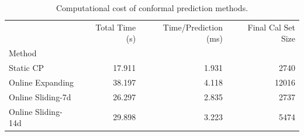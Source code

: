 \begin{table}
\caption{Computational cost of conformal prediction methods.}
\label{tab:t54_computational_cost}
\begin{tabular}{lrrr}
\toprule
 & Total Time (s) & Time/Prediction (ms) & Final Cal Set Size \\
Method &  &  &  \\
\midrule
Static CP & 17.911 & 1.931 & 2740 \\
Online Expanding & 38.197 & 4.118 & 12016 \\
Online Sliding-7d & 26.297 & 2.835 & 2737 \\
Online Sliding-14d & 29.898 & 3.223 & 5474 \\
\bottomrule
\end{tabular}
\end{table}
